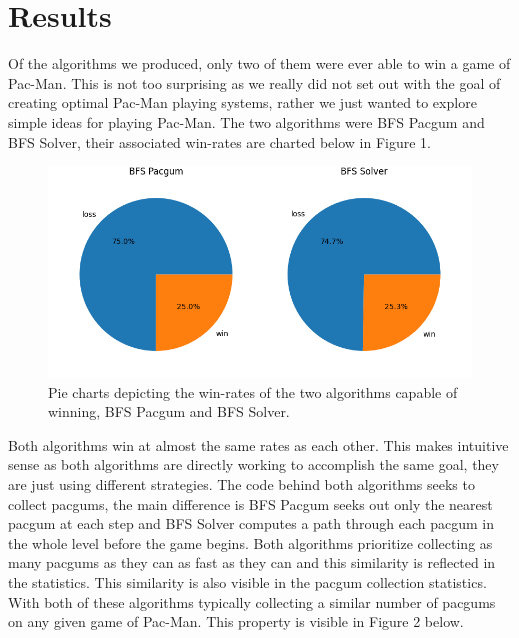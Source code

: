 \documentclass[12pt]{article}
\begin{document}
  \section*{Results}
    Of the algorithms we produced, only two of them were ever able to win a game of Pac-Man. This is not too surprising as we really did not set out with the goal of creating optimal Pac-Man playing systems, rather we just wanted to explore simple ideas for playing Pac-Man. The two algorithms were BFS Pacgum and BFS Solver, their associated win-rates are charted below in Figure 1.
    \begin{figure}[H]
      \begin{center}
        \includegraphics[width = .885\linewidth]{../../graphs/wins.png}
        \captionsetup{width = .885\linewidth}
        \caption{Pie charts depicting the win-rates of the two algorithms capable of winning, BFS Pacgum and BFS Solver.}
      \end{center}
    \end{figure}
    Both algorithms win at almost the same rates as each other. This makes intuitive sense as both algorithms are directly working to accomplish the same goal, they are just using different strategies. The code behind both algorithms seeks to collect pacgums, the main difference is BFS Pacgum seeks out only the nearest pacgum at each step and BFS Solver computes a path through each pacgum in the whole level before the game begins. Both algorithms prioritize collecting as many pacgums as they can as fast as they can and this similarity is reflected in the statistics. This similarity is also visible in the pacgum collection statistics. With both of these algorithms typically collecting a similar number of pacgums on any given game of Pac-Man. This property is visible in Figure 2 below.
\end{document}
